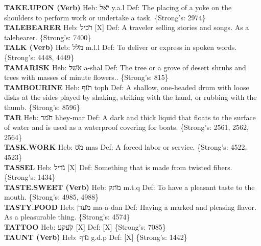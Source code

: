 {\textbf{TAKE.UPON (Verb)} Heb: {\large\H יאל} y.a.l Def: The placing of a yoke on the shoulders to perform work or undertake a task. \{Strong's: 2974\}\hfill{}\\

\textbf{TALEBEARER} Heb: {\large\H רכיל} {[}X{]} Def: A traveler selling stories and songs. As a talebearer. \{Strong's: 7400\}\hfill{}\\

\textbf{TALK (Verb)} Heb: {\large\H מלל} m.l.l Def: To deliver or express in spoken words. \{Strong's: 4448, 4449\}\hfill{}\\

\textbf{TAMARISK} Heb: {\large\H אשל} a-shal Def: The tree or a grove of desert shrubs and trees with masses of minute flowers.. \{Strong's: 815\}\hfill{}\\

\textbf{TAMBOURINE} Heb: {\large\H תוף} toph Def: A shallow, one-headed drum with loose disks at the sides played by shaking, striking with the hand, or rubbing with the thumb. \{Strong's: 8596\}\hfill{}\\

\textbf{TAR} Heb: {\large\H חמר} hhey-mar Def: A dark and thick liquid that floats to the surface of water and is used as a waterproof covering for boats. \{Strong's: 2561, 2562, 2564\}\hfill{}\\

\textbf{TASK.WORK} Heb: {\large\H מס} mas Def: A forced labor or service. \{Strong's: 4522, 4523\}\hfill{}\\

\textbf{TASSEL} Heb: {\large\H גדיל} {[}X{]} Def: Something that is made from twisted fibers. \{Strong's: 1434\}\hfill{}\\

\textbf{TASTE.SWEET (Verb)} Heb: {\large\H מתק} m.t.q Def: To have a pleasant taste to the mouth. \{Strong's: 4985, 4988\}\hfill{}\\

\textbf{TASTY.FOOD} Heb: {\large\H מעדן} ma-a-dan Def: Having a marked and pleasing flavor. As a pleasurable thing. \{Strong's: 4574\}\hfill{}\\

\textbf{TATTOO} Heb: {\large\H קעקע} {[}X{]} Def: {[}X{]} \{Strong's: 7085\}\hfill{}\\

\textbf{TAUNT (Verb)} Heb: {\large\H גדף} g.d.p Def: {[}X{]} \{Strong's: 1442\}\hfill{}\\

}
